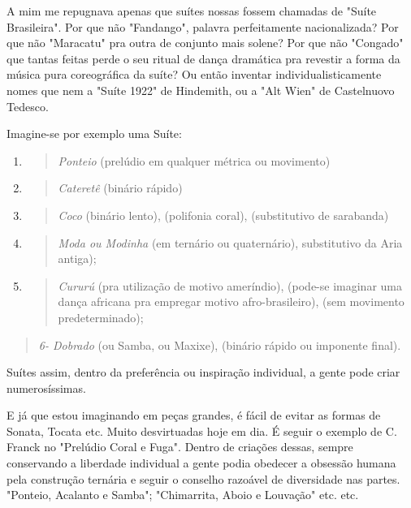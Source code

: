 A mim me repugnava apenas que suítes nossas fossem chamadas de "Suíte
Brasileira". Por que não "Fandango", palavra perfeitamente
nacionalizada? Por que não "Maracatu" pra outra de conjunto mais solene?
Por que não "Congado" que tantas feitas perde o seu ritual de dança
dramática pra revestir a forma da música pura coreográfica da suíte? Ou
então inventar individualisticamente nomes que nem a "Suíte 1922" de
Hindemith, ou a "Alt Wien" de Castelnuovo Tedesco.~

Imagine-se por exemplo uma Suíte:

\begin{enumerate}
\def\labelenumi{\arabic{enumi}.}
\item
  \begin{quote}
  \emph{Ponteio} (prelúdio em qualquer métrica ou movimento)
  \end{quote}
\item
  \begin{quote}
  \emph{Cateretê} (binário rápido)
  \end{quote}
\item
  \begin{quote}
  \emph{Coco} (binário lento), (polifonia coral), (substitutivo de
  sarabanda)
  \end{quote}
\item
  \begin{quote}
  \emph{Moda ou Modinha} (em ternário ou quaternário), substitutivo da
  Aria antiga);
  \end{quote}
\item
  \begin{quote}
  \emph{Cururú} (pra utilização de motivo ameríndio), (pode-se imaginar
  uma dança africana pra empregar motivo afro-brasileiro), (sem
  movimento predeterminado);
  \end{quote}
\end{enumerate}

\begin{quote}
\emph{6- Dobrado} (ou Samba, ou Maxixe), (binário rápido ou imponente
final).
\end{quote}

Suítes assim, dentro da preferência ou inspiração individual, a gente
pode criar numerosíssimas.

E já que estou imaginando em peças grandes, é fácil de evitar as formas
de Sonata, Tocata etc. Muito desvirtuadas hoje em dia. É seguir o
exemplo de C. Franck no "Prelúdio Coral e Fuga". Dentro de criações
dessas, sempre conservando a liberdade individual a gente podia obedecer
a obsessão humana pela construção ternária e seguir o conselho razoável
de diversidade nas partes. "Ponteio, Acalanto e Samba"; "Chimarrita,
Aboio e Louvação" etc. etc.

